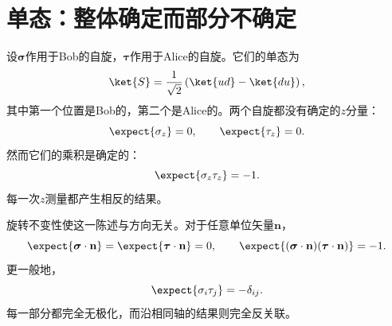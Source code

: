 \begin{classroomqa}
\end{classroomqa}

\begin{classroomqa}
\end{classroomqa}

\begin{classroomqa}
\end{classroomqa}

\section{单态：整体确定而部分不确定}

设\(\boldsymbol{\sigma}\)作用于Bob的自旋，\(\boldsymbol{\tau}\)作用于Alice的自旋。它们的单态为
\begin{equation}
\ket{S}
=\frac{1}{\sqrt2}
\left(\ket{u d}-\ket{d u}\right),
\label{eq:l7-singlet}
\end{equation}
其中第一个位置是Bob的，第二个是Alice的。两个自旋都没有确定的\(z\)分量：
\begin{equation}
\expect{\sigma_z}=0,
\qquad
\expect{\tau_z}=0.
\label{eq:l7-singlet-local-z}
\end{equation}
然而它们的乘积是确定的：
\begin{equation}
\expect{\sigma_z\tau_z}=-1.
\label{eq:l7-singlet-product-z}
\end{equation}
每一次\(z\)测量都产生相反的结果。

旋转不变性使这一陈述与方向无关。对于任意单位矢量\(\mathbf n\)，
\begin{equation}
\expect{\boldsymbol{\sigma}\cdot\mathbf n}
=\expect{\boldsymbol{\tau}\cdot\mathbf n}=0,
\qquad
\expect{
(\boldsymbol{\sigma}\cdot\mathbf n)
(\boldsymbol{\tau}\cdot\mathbf n)
}=-1.
\label{eq:l7-singlet-any-axis}
\end{equation}
更一般地，
\begin{equation}
\expect{\sigma_i\tau_j}=-\delta_{ij}.
\label{eq:l7-singlet-correlation-tensor}
\end{equation}
每一部分都完全无极化，而沿相同轴的结果则完全反关联。

